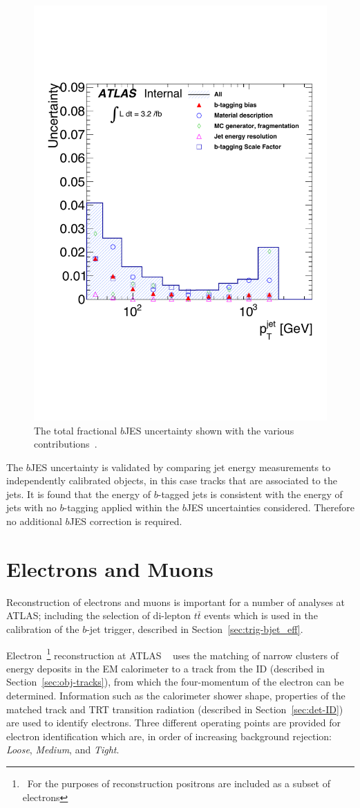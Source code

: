 \begin{figure}[!hbt]
  \begin{center}
    \includegraphics[width=0.45\linewidth, angle=0]{figs/Objects/bjets_bJES_uncert_edit.pdf}
  \vspace{-2em}
  \end{center}
  \caption[The total fractional $b$JES uncertainty shown with the various contributions.]
          {\label{fig:obj-bjets_bJES_uncert} The total fractional $b$JES uncertainty shown with the various contributions~\cite{dibjet-int_mori16}.}
\end{figure}

The $b$JES uncertainty is validated by comparing jet energy measurements to independently calibrated objects, in this case tracks that are associated to the jets.
It is found that the energy of $b$-tagged jets is consistent with the energy of jets with no $b$-tagging applied
within the $b$JES uncertainties considered. Therefore no additional $b$JES correction is required.

\section{Electrons and Muons}
\label{sec:obj-leptons}

Reconstruction of electrons and muons
is important for a number of analyses at ATLAS;
including the selection of di-lepton $t\bar{t}$ events
which is used in the calibration of  the $b$-jet trigger,
described in Section~\ref{sec:trig-bjet_eff}.

Electron~\footnote{\ For the purposes of reconstruction positrons are included as a subset of electrons}
reconstruction at ATLAS ~\cite{obj-electrons} uses
the matching of narrow clusters of energy deposits in the EM calorimeter
to a track from the ID (described in Section~\ref{sec:obj-tracks}),
from which the four-momentum of the electron can be determined.
Information such as the calorimeter shower shape,
properties of the matched track
and TRT transition radiation (described in Section~\ref{sec:det-ID})
are used to identify electrons.
Three different operating points are provided for electron identification
which are, in order of increasing background rejection:
\textit{Loose}, \textit{Medium}, and \textit{Tight}. 

